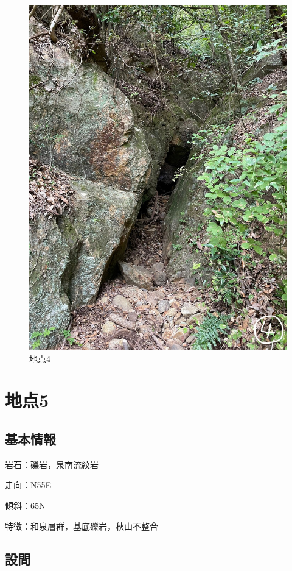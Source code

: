 \documentclass[uplatex,b5paper]{jsreport}
\begin{document}
\begin{figure}[h]
\begin{center}
        \includegraphics[scale=0.15]{files/地学実習/地点4_2.jpg}
        \caption{地点4}
      \end{center}
    \end{figure}
  \clearpage

  \section{地点5}
    \subsection{基本情報}
    岩石：礫岩，泉南流紋岩\par
    走向：N55\textdegree E\par
    傾斜：65\textdegree N\par
    特徴：和泉層群，基底礫岩，秋山不整合
    \subsection{設問}
\end{document}
